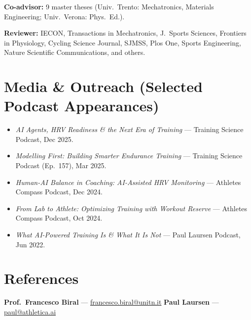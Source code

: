 \documentclass[10pt,a4paper]{article}
\begin{document}
\textbf{Co-advisor:} 9 master theses (Univ.\ Trento: Mechatronics, Materials Engineering; Univ.\ Verona: Phys.\ Ed.).

\textbf{Reviewer:} IECON, Transactions in Mechatronics, J.\ Sports Sciences, Frontiers in Physiology, Cycling Science Journal, SJMSS, Plos One, Sports Engineering, Nature Scientific Communications, and others.

\section{Media \& Outreach (Selected Podcast Appearances)}

\begin{itemize}
  \item \textit{AI Agents, HRV Readiness \& the Next Era of Training} — Training Science Podcast, Dec 2025.
  \item \textit{Modelling First: Building Smarter Endurance Training} — Training Science Podcast (Ep.\ 157), Mar 2025.
  \item \textit{Human-AI Balance in Coaching: AI-Assisted HRV Monitoring} — Athletes Compass Podcast, Dec 2024.
  \item \textit{From Lab to Athlete: Optimizing Training with Workout Reserve} — Athletes Compass Podcast, Oct 2024.
  \item \textit{What AI-Powered Training Is \& What It Is Not} — Paul Laursen Podcast, Jun 2022.
\end{itemize}

\section{References}

\textbf{Prof.\ Francesco Biral} — \href{mailto:francesco.biral@unitn.it}{francesco.biral@unitn.it} \quad
\textbf{Paul Laursen} — \href{mailto:paul@athletica.ai}{paul@athletica.ai}
\end{document}
